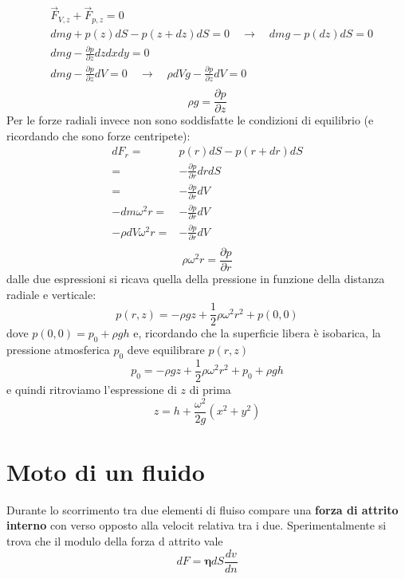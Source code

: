 \documentclass[x11names]{report}
\begin{document}
	\begin{align*}
			&\overrightarrow{F}_{V,z} + \overrightarrow{F}_{p,z} = 0 \\
			& dm g + p(z)dS - p(z+dz)dS = 0 \quad  \to \quad dmg - p(dz)dS = 0\\
			& dmg - \frac{\partial p}{\partial z}dzdxdy = 0 \\
			& dmg - \frac{\partial p}{\partial z}dV = 0  \quad \to \quad \rho dV g -  \frac{\partial p}{\partial z}dV = 0 \\
	\end{align*}
	\[ 
	\boxed{\rho g = \frac{\partial p}{\partial z}}
	\]
	Per le forze radiali invece non sono soddisfatte le condizioni di equilibrio (e ricordando che sono forze centripete):
	\begin{align*}
		dF_{r} =& p(r)dS - p(r+dr)dS \\
			   =& - \frac{\partial p}{\partial r}drdS \\
			   =& - \frac{\partial p}{\partial r}dV \\
		-dm \omega^2 r =& - \frac{\partial p}{\partial r}dV \\
		-\rho dV \omega^2 r =& - \frac{\partial p}{\partial r}dV \\
	\end{align*}
	\[ 
	\boxed{\rho \omega^2 r =  \frac{\partial p}{\partial r}}
	\]
	dalle due espressioni si ricava quella della pressione in funzione della distanza radiale e verticale:
	\begin{equation}
		p(r,z) = -\rho gz + \frac{1}{2}\rho \omega ^2 r^2 + p(0,0)
	\end{equation}
	dove \(p(0,0) = p_{0} + \rho gh\) e, ricordando che la superficie libera è isobarica, la pressione atmosferica \(p_{0}\) deve equilibrare \(p(r,z)\)
	\[ 
	p_{0} =  -\rho gz + \frac{1}{2}\rho \omega ^2 r^2 + p_{0} + \rho gh
	\]
	e quindi ritroviamo l'espressione di \(z\) di prima
	\[ 
	z = h +\frac{\omega ^2}{2g}(x^2 +y^2)
	\]
	
	\section{Moto  di un fluido}
	Durante lo scorrimento tra due elementi di fluiso compare una \textbf{forza di attrito interno} con verso opposto alla velocit relativa tra i due. Sperimentalmente si trova che il modulo della forza d attrito vale 
	\begin{equation}
		dF = \boldsymbol{\eta} dS \frac{dv}{dn}
	\end{equation}
	
\end{document}

